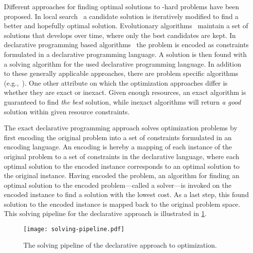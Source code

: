 Different approaches for finding optimal solutions to \NP-hard problems have been proposed.
In local search~\autocite{DBLP:books/daglib/0017492} a candidate solution is iteratively modified to find a better and hopefully optimal solution.
Evolutionary algorithms~\autocites{DBLP:books/daglib/0087893,DBLP:journals/jgo/StornP97} maintain a set of solutions that develops over time, where only the best candidates are kept.
In declarative programming based algorithms~\autocite{handbook2-maxsat,ChenEtAl2010-intro,DBLP:reference/fai/2} the problem is encoded as constraints formulated in a declarative programming language.
A solution is then found with a solving algorithm for the used declarative programming language.
In addition to these generally applicable approaches, there are problem specific algorithms (e.g.,~\autocite{DBLP:conf/aaai/DemirovicS21,DBLP:conf/kdd/NijssenF07,DBLP:conf/nips/HuRS19}).
One other attribute on which the optimization approaches differ is whether they are exact or inexact.
Given enough resources, an exact algorithm is guaranteed to find \emph{the best} solution, while inexact algorithms will return \emph{a good} solution within given resource constraints.

The exact declarative programming approach solves optimization problems by first encoding the original problem into a set of constraints formulated in an encoding language.
An encoding is hereby a mapping of each instance of the original problem to a set of constraints in the declarative language, where each optimal solution to the encoded instance corresponds to an optimal solution to the original instance.
Having encoded the problem, an algorithm for finding an optimal solution to the encoded problem---called a solver---is invoked on the encoded instance to find a solution with the lowest cost.
As a last step, this found solution to the encoded instance is mapped back to the original problem space.
This solving pipeline for the declarative approach is illustrated in \cref{fig:solving-pipeline}.

\begin{figure}
  \centering
  \texttt{[image: solving-pipeline.pdf]}
  \caption{The solving pipeline of the declarative approach to optimization.}\label{fig:solving-pipeline}
\end{figure}

